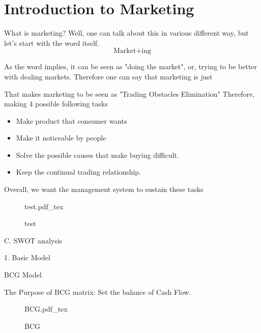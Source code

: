 \documentclass[12pt]{article}
\begin{document}
\maketitle

\section{Introduction to Marketing}

What is marketing? Well, one can talk about this in various different way, but let's start with the word itself.
$$ \text{Market}+\text{ing} $$

As the word implies, it can be seen as "doing the market", or, trying to be better with dealing markets. Therefore one can say that marketing is just

\begin{tcolorbox}
\end{tcolorbox}

That makes marketing to be seen as "Trading Obstacles Elimination" Therefore, making 4 possible following tasks
\begin{itemize}
	\item Make product that consumer wants
	\item Make it noticeable by people
	\item Solve the possible causes that make buying difficult.
	\item Keep the continual trading relationship.
\end{itemize}

Overall, we want the management system to sustain these tasks
\begin{figure}[ht]
	\centering
	\def\svgwidth{\columnwidth}
	{test.pdf_tex}
	\caption{test}
	\label{fig:test}
\end{figure}

C. SWOT analysis

1. Basic Model

BCG Model

The Purpose of BCG matrix: Set the balance of Cash Flow.
\begin{figure}[H]
	\centering
	\def\svgwidth{\columnwidth}
	{BCG.pdf_tex}
	\caption{BCG}
	\label{fig:BCG Model}
\end{figure}
\end{document}
